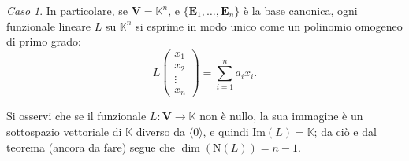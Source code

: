 \documentclass{article}
\theoremstyle{plain}
\theoremstyle{definition}
\theoremstyle{remark}
\newtheorem{case}{Caso}
\begin{document}
\vspace{10pt}

\begin{case}
In particolare, se $\mathbf{V}=\mathbb{K}^n$, e $\{\mathbf{E}_1,\ldots,\mathbf{E}_n\}$ è la base canonica, ogni funzionale lineare $L$ su $\mathbb{K}^n$ si esprime in modo unico come un polinomio omogeneo di primo grado:
\begin{equation}\label{undiciuno}
    L\begin{pmatrix}
    x_1\\
    x_2\\
    \vdots\\
    x_n
\end{pmatrix}=\sum_{i=1}^{n}a_ix_i.
\end{equation}
\end{case}

\vspace{10pt}

Si osservi che se il funzionale $L:\mathbf{V}\to\mathbb{K}$ non è nullo, la sua immagine è un sottospazio vettoriale di $\mathbb{K}$ diverso da $\langle0\rangle$, e quindi $\mathrm{Im}(L)=\mathbb{K}$; da ciò e dal teorema (ancora da fare) segue che $\dim(\mathrm{N}(L))=n-1$.

\vspace{10pt}
\end{document}
